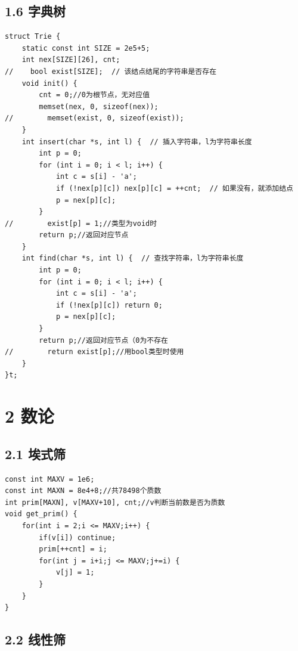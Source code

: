 \documentclass[11pt]{article}		%
\begin{document}
\subsection{1.6 字典树}\label{ux5b57ux5178ux6811}

\begin{verbatim}
struct Trie {
    static const int SIZE = 2e5+5;
    int nex[SIZE][26], cnt;
//    bool exist[SIZE];  // 该结点结尾的字符串是否存在
    void init() {
        cnt = 0;//0为根节点，无对应值
        memset(nex, 0, sizeof(nex));
//        memset(exist, 0, sizeof(exist));
    }
    int insert(char *s, int l) {  // 插入字符串，l为字符串长度
        int p = 0;
        for (int i = 0; i < l; i++) {
            int c = s[i] - 'a';
            if (!nex[p][c]) nex[p][c] = ++cnt;  // 如果没有，就添加结点
            p = nex[p][c];
        }
//        exist[p] = 1;//类型为void时
        return p;//返回对应节点
    }
    int find(char *s, int l) {  // 查找字符串，l为字符串长度
        int p = 0;
        for (int i = 0; i < l; i++) {
            int c = s[i] - 'a';
            if (!nex[p][c]) return 0;
            p = nex[p][c];
        }
        return p;//返回对应节点（0为不存在
//        return exist[p];//用bool类型时使用
    }
}t;
\end{verbatim}

\newpage

\pagestyle{fancy}


\section{2 数论}\label{ux6570ux8bba}

\subsection{2.1 埃式筛}\label{ux57c3ux5f0fux7b5b}

\begin{verbatim}
const int MAXV = 1e6;
const int MAXN = 8e4+8;//共78498个质数
int prim[MAXN], v[MAXV+10], cnt;//v判断当前数是否为质数
void get_prim() {
    for(int i = 2;i <= MAXV;i++) {
        if(v[i]) continue;
        prim[++cnt] = i;
        for(int j = i+i;j <= MAXV;j+=i) {
            v[j] = 1;
        }
    }
}
\end{verbatim}

\subsection{2.2 线性筛}\label{ux7ebfux6027ux7b5b}
\end{document}
